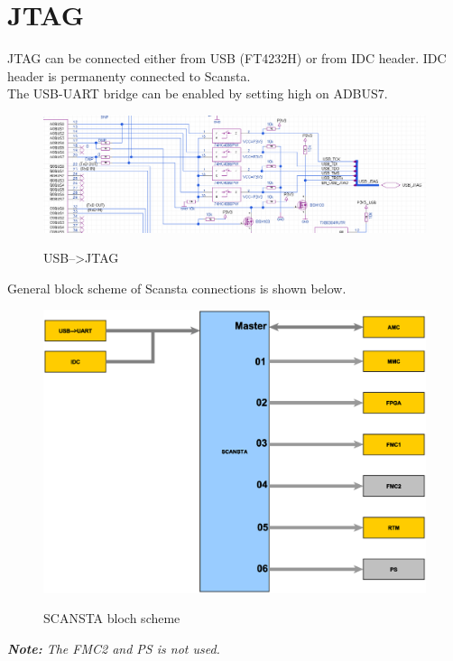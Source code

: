 \section{JTAG}

JTAG can be connected either from USB (FT4232H) or from IDC header. IDC header is permanenty connected to Scansta. \\
The USB-UART bridge can be enabled by setting high on ADBUS7.\\



	\begin{figure}[htbp!]
		\centering
		\includegraphics[scale=0.5]{img/jtag.png}\\
		\caption{USB-->JTAG} 
	\end{figure}
General block scheme of Scansta connections is shown below.\\
	
		\begin{figure}[htbp!]
			\centering
			\includegraphics[scale=0.4]{img/scansta.eps}\\
			\caption{SCANSTA bloch scheme} 
		\end{figure}
		
	\textit{\textbf{Note:} The FMC2 and PS is not used.}\\
	
